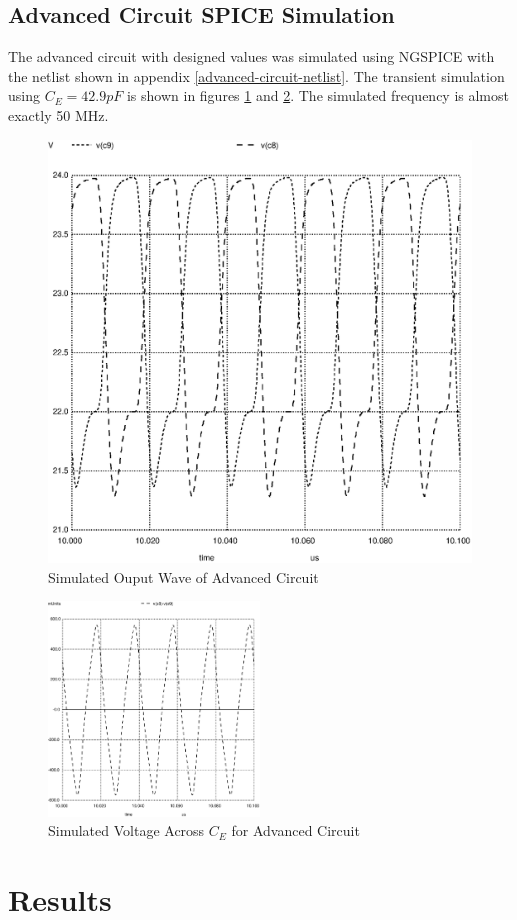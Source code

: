 \documentclass[titlepage, letterpaper, 10.5pt]{article}
\begin{document}
\subsection{Advanced Circuit SPICE Simulation}

The advanced circuit with designed values was simulated using NGSPICE
with the netlist shown in appendix \ref{advanced-circuit-netlist}.
The transient simulation using $C_{E}=42.9pF$ is shown in figures
\ref{advanced-circuit-output-43pF} and \ref{advanced-circuit-vcap-43pF}.
The simulated frequency is almost exactly 50 MHz.

\begin{figure}[ht]
	\centering
	\includegraphics[width=.5\textwidth]{ngspice/advanced-circuit-output-43pF}
	\caption{Simulated Ouput Wave of Advanced Circuit}
	\label{advanced-circuit-output-43pF}
\end{figure}

\begin{figure}[ht]
	\centering
	\includegraphics[width=0.5\textwidth]{ngspice/advanced-circuit-vcap-43pF}
	\caption{Simulated Voltage Across $C_{E}$ for Advanced Circuit}
	\label{advanced-circuit-vcap-43pF}
\end{figure}


\section{Results}
\end{document}

